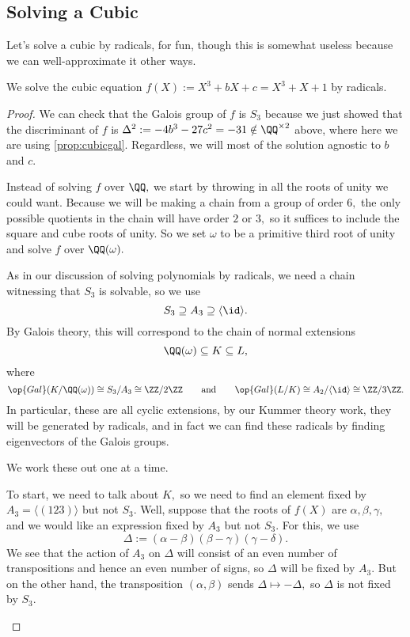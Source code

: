 \subsection{Solving a Cubic}
Let's solve a cubic by radicals, for fun, though this is somewhat useless because we can well-approximate it other ways.
\begin{exe}
	We solve the cubic equation $f(X):=X^3+bX+c=X^3+X+1$ by radicals.
\end{exe}
\begin{proof}
	We can check that the Galois group of $f$ is $S_3$ because we just showed that the discriminant of $f$ is $\Delta^2:=-4b^3-27c^2=-31\notin\QQ^{\times2}$ above, where here we are using \autoref{prop:cubicgal}. Regardless, we will most of the solution agnostic to $b$ and $c.$

	Instead of solving $f$ over $\QQ,$ we start by throwing in all the roots of unity we could want. Because we will be making a chain from a group of order $6,$ the only possible quotients in the chain will have order $2$ or $3,$ so it suffices to include the square and cube roots of unity. So we set $\omega$ to be a primitive third root of unity and solve $f$ over $\QQ(\omega).$

	As in our discussion of solving polynomials by radicals, we need a chain witnessing that $S_3$ is solvable, so we use
	\[S_3\supseteq A_3\supseteq\langle\id\rangle.\]
	By Galois theory, this will correspond to the chain of normal extensions
	\[\QQ(\omega)\subseteq K\subseteq L,\]
	where
	\[\op{Gal}(K/\QQ(\omega))\cong S_3/A_3\cong\ZZ/2\ZZ\qquad\text{and}\qquad\op{Gal}(L/K)\cong A_2/\langle\id\rangle\cong\ZZ/3\ZZ.\]
	In particular, these are all cyclic extensions, by our Kummer theory work, they will be generated by radicals, and in fact we can find these radicals by finding eigenvectors of the Galois groups.

	We work these out one at a time.
	\begin{listroman}
		\item To start, we need to talk about $K,$ so we need to find an element fixed by $A_3=\langle(123)\rangle$ but not $S_3.$ Well, suppose that the roots of $f(X)$ are $\alpha,\beta,\gamma,$ and we would like an expression fixed by $A_3$ but not $S_3.$ For this, we use
		\[\Delta:=(\alpha-\beta)(\beta-\gamma)(\gamma-\delta).\]
		We see that the action of $A_3$ on $\Delta$ will consist of an even number of transpositions and hence an even number of signs, so $\Delta$ will be fixed by $A_3.$ But on the other hand, the transposition $(\alpha,\beta)$ sends $\Delta\mapsto-\Delta,$ so $\Delta$ is not fixed by $S_3.$
		

\end{listroman}
\end{proof}
